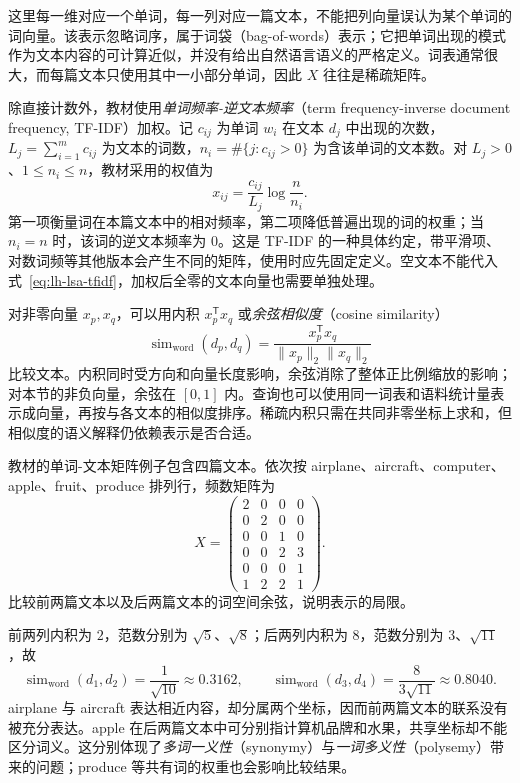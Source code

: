 这里每一维对应一个单词，每一列对应一篇文本，不能把列向量误认为某个单词的词向量。该表示忽略词序，属于词袋（bag-of-words）表示；它把单词出现的模式作为文本内容的可计算近似，并没有给出自然语言语义的严格定义。词表通常很大，而每篇文本只使用其中一小部分单词，因此 $X$ 往往是稀疏矩阵。

除直接计数外，教材使用\emph{单词频率-逆文本频率}（term frequency-inverse document frequency, TF-IDF）加权。记 $c_{ij}$ 为单词 $w_i$ 在文本 $d_j$ 中出现的次数，$L_j=\sum_{i=1}^m c_{ij}$ 为文本的词数，$n_i=\#\{j:c_{ij}>0\}$ 为含该单词的文本数。对 $L_j>0$、$1\leq n_i\leq n$，教材采用的权值为
\begin{equation}
x_{ij}=\frac{c_{ij}}{L_j}\log\frac{n}{n_i}.
\label{eq:lh-lsa-tfidf}
\end{equation}
第一项衡量词在本篇文本中的相对频率，第二项降低普遍出现的词的权重；当 $n_i=n$ 时，该词的逆文本频率为 $0$。这是 TF-IDF 的一种具体约定，带平滑项、对数词频等其他版本会产生不同的矩阵，使用时应先固定定义。空文本不能代入式~\eqref{eq:lh-lsa-tfidf}，加权后全零的文本向量也需要单独处理。

对非零向量 $x_p,x_q$，可以用内积 $x_p^{\mathsf T}x_q$ 或\emph{余弦相似度}（cosine similarity）
\begin{equation}
\operatorname{sim}_{\mathrm{word}}(d_p,d_q)
=\frac{x_p^{\mathsf T}x_q}{\|x_p\|_2\|x_q\|_2}
\label{eq:lh-lsa-word-cosine}
\end{equation}
比较文本。内积同时受方向和向量长度影响，余弦消除了整体正比例缩放的影响；对本节的非负向量，余弦在 $[0,1]$ 内。查询也可以使用同一词表和语料统计量表示成向量，再按与各文本的相似度排序。稀疏内积只需在共同非零坐标上求和，但相似度的语义解释仍依赖表示是否合适。

\begin{example}
\label{ex:lh-lsa-synonym-polysemy}
教材的单词-文本矩阵例子包含四篇文本。依次按 airplane、aircraft、computer、apple、fruit、produce 排列行，频数矩阵为
\begin{equation}
X=\begin{pmatrix}
2&0&0&0\\
0&2&0&0\\
0&0&1&0\\
0&0&2&3\\
0&0&0&1\\
1&2&2&1
\end{pmatrix}.
\label{eq:lh-lsa-four-documents}
\end{equation}
比较前两篇文本以及后两篇文本的词空间余弦，说明表示的局限。
\end{example}
\begin{solve}
前两列内积为 $2$，范数分别为 $\sqrt5$、$\sqrt8$；后两列内积为 $8$，范数分别为 $3$、$\sqrt{11}$，故
\[
\operatorname{sim}_{\mathrm{word}}(d_1,d_2)=\frac1{\sqrt{10}}\approx0.3162,
\qquad
\operatorname{sim}_{\mathrm{word}}(d_3,d_4)=\frac8{3\sqrt{11}}\approx0.8040.
\]
airplane 与 aircraft 表达相近内容，却分属两个坐标，因而前两篇文本的联系没有被充分表达。apple 在后两篇文本中可分别指计算机品牌和水果，共享坐标却不能区分词义。这分别体现了\emph{多词一义性}（synonymy）与\emph{一词多义性}（polysemy）带来的问题；produce 等共有词的权重也会影响比较结果。
\end{solve}

